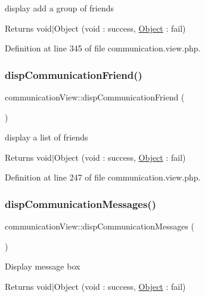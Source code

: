 display add a group of friends \begin{DoxyReturn}{Returns}
void$\vert$\+Object (void \+: success, \hyperlink{classObject}{Object} \+: fail) 
\end{DoxyReturn}


Definition at line 345 of file communication.\+view.\+php.

\mbox{\label{classcommunicationView_a676e4e4ab5900c536557befbbde6a88a}} 
\subsubsection{\texorpdfstring{disp\+Communication\+Friend()}{dispCommunicationFriend()}}
{\footnotesize\ttfamily communication\+View\+::disp\+Communication\+Friend (\begin{DoxyParamCaption}{ }\end{DoxyParamCaption})}

display a list of friends \begin{DoxyReturn}{Returns}
void$\vert$\+Object (void \+: success, \hyperlink{classObject}{Object} \+: fail) 
\end{DoxyReturn}


Definition at line 247 of file communication.\+view.\+php.

\mbox{\label{classcommunicationView_af3af3334ae9f2e3a7809fe5b4957bc2b}} 
\subsubsection{\texorpdfstring{disp\+Communication\+Messages()}{dispCommunicationMessages()}}
{\footnotesize\ttfamily communication\+View\+::disp\+Communication\+Messages (\begin{DoxyParamCaption}{ }\end{DoxyParamCaption})}

Display message box \begin{DoxyReturn}{Returns}
void$\vert$\+Object (void \+: success, \hyperlink{classObject}{Object} \+: fail) 
\end{DoxyReturn}


